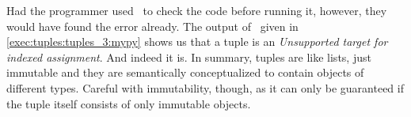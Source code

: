 Had the programmer used \mypy\ to check the code before running it, however, they would have found the error already.
The output of \mypy\ given in \cref{exec:tuples:tuples_3:mypy} shows us that a tuple is an \emph{Unsupported target for indexed assignment}.
And indeed it is.%
%
%
%
In summary, tuples are like lists, just immutable and they are semantically conceptualized to contain objects of different types.
Careful with immutability, though, as it can only be guaranteed if the tuple itself consists of only immutable objects.%
%
\FloatBarrier%
\endhsection%
%
